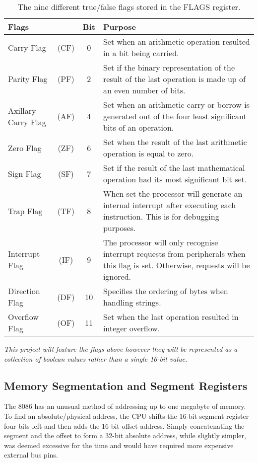     \begin{table}[h]
        \centering
        \begin{tabular} { | l c | c | m{} | }
            \hline
            Flags & & Bit & Purpose \\
            \hline
            Carry Flag              & (CF) &  0 & Set when an arithmetic operation resulted in a bit being carried. \\
            Parity Flag             & (PF) &  2 & Set if the binary representation of the result of the last operation is made up of an even number of bits. \\
            Axillary Carry Flag     & (AF) &  4 & Set when an arithmetic carry or borrow is generated out of the four least significant bits of an operation. \\
            Zero Flag               & (ZF) &  6 & Set when the result of the last arithmetic operation is equal to zero. \\
            Sign Flag               & (SF) &  7 & Set if the result of the last mathematical operation had its most significant bit set. \\
            Trap Flag               & (TF) &  8 & When set the processor will generate an internal interrupt after executing each instruction. This is for debugging purposes. \\
            Interrupt Flag          & (IF) &  9 & The processor will only recognise interrupt requests from peripherals when this flag is set. Otherwise, requests will be ignored. \\
            Direction Flag          & (DF) & 10 & Specifies the ordering of bytes when handling strings. \\
            Overflow Flag           & (OF) & 11 & Set when the last operation resulted in integer overflow. \\
            \hline
        \end{tabular}
        \caption{The nine different true/false flags stored in the FLAGS register.}
        \label{table:flags}
    \end{table}

    \textit{This project will feature the flags above however they will be represented as a collection of boolean values rather than a single 16-bit value.}

\subsection{Memory Segmentation and Segment Registers}
    The 8086 has an unusual method of addressing up to one megabyte of memory. To find an absolute/physical address, the CPU shifts the 16-bit segment register four bits left and then adds the 16-bit offset address. Simply concatenating the segment and the offset to form a 32-bit absolute address, while slightly simpler, was deemed excessive for the time and would have required more expensive external bus pins.

